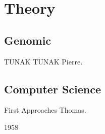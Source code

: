 \section{Theory}

\subsection{Genomic}

\begin{frame}[plain]{TUNAK TUNAK}
Pierre.
\end{frame}

\subsection{Computer Science}

\begin{frame}{First Approaches}
Thomas.
  \begin{block}{1958}
    \cite{fraser1958monte}
  \end{block}
\end{frame}
